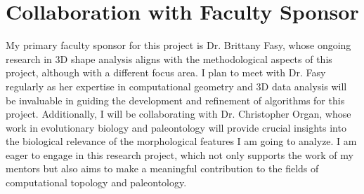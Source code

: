 \documentclass[12pt]{article}
\begin{document}
\section{Collaboration with Faculty Sponsor}
My primary faculty sponsor for this project is Dr. Brittany Fasy, whose ongoing
research in 3D shape analysis aligns with the methodological aspects of this
project, although with a different focus area. I plan to meet with Dr. Fasy
regularly as her expertise in computational geometry and 3D data analysis will
be invaluable in guiding the development and refinement of algorithms for this
project. Additionally, I will be collaborating with Dr. Christopher Organ, whose
work in evolutionary biology and paleontology will provide crucial insights into
the biological relevance of the morphological features I am going to analyze. I am
eager to engage in this research project, which not only supports the work of my
mentors but also aims to make a meaningful contribution to the fields of
computational topology and paleontology.

\newpage

 
% 
%
\end{document}
